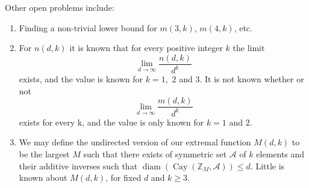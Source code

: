 \documentclass[11pt]{article}
\theoremstyle{definition}
\def\Z{\mbox{$\mathbb Z$}}
\def\Cay{\operatorname{Cay}}
\def\diam{\operatorname{diam}}
\begin{document}
 Other open problems include: 
\begin{enumerate}[\bf 1.]
\item  Finding a non-trivial lower bound for $m(3,k)$, $m(4,k)$, etc.

\item  For $n(d,k)$ it is known that for every positive integer $k$ the limit 
\[
\lim_{d \to \infty}{\frac{n(d,k)}{d^k}}
\]
exists, and the value is known for $k = 1,$ $2$ and $3$.  It is not known whether or not 
\[
\lim_{d \to \infty}{\frac{m(d,k)}{d^k}}
\]
exists for every k, and the value is only known for $k = 1$ and $2$. \\

\item  We may define the undirected version of our extremal function $M(d,k)$ to be the largest $M$ such that there exists of symmetric set $\mathscr{A}$ of $k$ elements and their additive inverses such that $\diam(\Cay(\Z_M,\mathscr{A})) \leq d$.  Little is known about $M(d,k)$, for fixed $d$ and $k \geq 3$. \\
\end{enumerate}

	
		
\end{document}
